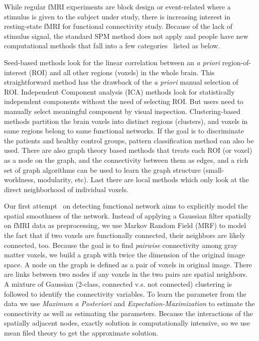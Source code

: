\documentclass[]{article}
\begin{document}
While regular fMRI experiments are block design or event-related where a
stimulus is given to the subject under study, there is increasing interest in
resting-state fMRI for functional connectivity study. Because of the lack of
stimulus signal, the standard SPM method does not apply and people have new
computational methods that fall into a few
categories~\cite{margulies2010resting} listed as below.

Seed-based methods look for the linear correlation between an \emph{a priori}
region-of-interest (ROI) and all other regions (voxels) in the whole brain. This
straightforward method has the drawback of the \emph{a priori} manual selection
of ROI. Independent Component analysis (ICA) methods look for statistically
independent components without the need of selecting ROI. But users need to
manually select meaningful component by visual inspection. Clustering-based
methods partition the brain voxels into distinct regions (clusters), and voxels
in same regions belong to same functional networks. If the goal is to
discriminate the patients and healthy control groups, pattern classification
method can also be used. There are also graph theory based methods that treats
each ROI (or voxel) as a node on the graph, and the connectivity between them as
edges, and a rich set of graph algorithms can be used to learn the graph
structure (small-worldness, modularity, etc). Last there are local methods which
only look at the direct neighborhood of individual voxels.

Our first attempt~\cite{SCI:Liu2010a} on detecting functional network aims to
explicitly model the spatial smoothness of the network. Instead of applying a
Gaussian filter spatially on fMRI data as preprocessing, we use Markov Random
Field (MRF) to model the fact that if two voxels are functionally connected,
their neighbors are likely connected, too. Because the goal is to find
\emph{pairwise} connectivity among gray matter voxels, we build a graph with
twice the dimension of the original image space. A node on the graph is defined
as a pair of voxels in original image. There are links between two nodes if any
voxels in the two pairs are spatial neighbors. A mixture of Gaussian (2-class,
connected v.s. not connected) clustering is followed to identify the
connectivity variables. To learn the parameter from the data we use
\emph{Maximum a Posteriori} and \emph{Expectation-Maximization} to estimate the
connectivity as well as estimating the parameters. Because the interactions of
the spatially adjacent nodes, exactly solution is computationally intensive, so
we use mean filed theory to get the approximate solution.
\end{document}
